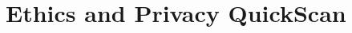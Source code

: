 \documentclass[11pt,a4paper,oneside]{book}
\begin{document}
\frontmatter
    
    \frontmaterial
    
    \tableofcontents

\mainmatter
    \mainmaterial
    
    
    
    
    
    

\printbibliography

\appendix
    
    \chapter{Ethics and Privacy QuickScan}
    
\end{document}
